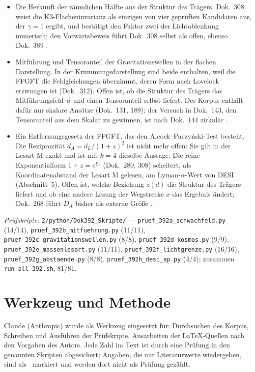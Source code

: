 \begin{itemize}[leftmargin=*,itemsep=1pt]
\item Die Herkunft der räumlichen Hälfte aus der Struktur des Trägers. Dok.~308 weist die
K3-Flächeninvarianz als einzigen von vier geprüften Kandidaten aus, der $\gamma=1$ ergibt, und bestätigt
den Faktor zwei der Lichtablenkung numerisch; den Vorwärtsbeweis führt Dok.~308 selbst als offen,
ebenso Dok.~389 \SM.
\item Mitführung und Tensoranteil der Gravitationswellen in der flachen Darstellung. In der
Krümmungsdarstellung sind beide enthalten, weil die FFGFT die Feldgleichungen übernimmt, deren Form
nach Lovelock erzwungen ist (Dok.~312). Offen ist, ob die Struktur des Trägers das Mitführungsfeld
$\vec u$ und einen Tensoranteil selbst liefert. Der Korpus enthält dafür nur skalare Ansätze
(Dok.~131, 189); der Versuch in Dok.~143, den Tensoranteil aus dem Skalar zu gewinnen, ist nach
Dok.~144 zirkulär \SM.
\item Ein Entfernungsgesetz der FFGFT, das den Alcock--Paczyński-Test besteht. Die Reziprozität
$d_A=d_L/(1+z)^2$ ist nicht mehr offen: Sie gilt in der Lesart M exakt und ist mit $k=4$ dieselbe
Aussage. Die reine Exponentialform $1+z=e^{\xi x}$ (Dok.~280, 308) scheitert, als Koordinatenabstand
der Lesart M gelesen, am Lyman-$\alpha$-Wert von DESI (Abschnitt~5). Offen ist, welche Beziehung
$z(d)$ die Struktur des Trägers liefert und ob eine andere Lesung der Wegstrecke $x$ das Ergebnis
ändert; Dok.~268 führt $D_A$ bisher als externe Größe \SM.
\end{itemize}

\vspace{1em}
\noindent\textit{Prüfskripte:} \texttt{2/python/Dok392\_Skripte/} --- \texttt{pruef\_392a\_schwachfeld.py}
(14/14), \texttt{pruef\_392b\_mitfuehrung.py} (11/11), \texttt{pruef\_392c\_gravitationswellen.py} (8/8),
\texttt{pruef\_392d\_kosmos.py} (9/9), \texttt{pruef\_392e\_massenlesart.py} (11/11), \texttt{pruef\_392f\_lichtgrenze.py} (16/16), \texttt{pruef\_392g\_abstaende.py} (8/8),
\texttt{pruef\_392h\_desi\_ap.py} (4/4); zusammen \texttt{run\_all\_392.sh}, 81/81.

\section*{Werkzeug und Methode}

Claude (Anthropic) wurde als Werkzeug eingesetzt für: Durchsuchen des Korpus, Schreiben und Ausführen
der Prüfskripte, Ausarbeiten der \LaTeX-Quellen nach den Vorgaben des Autors. Jede Zahl im Text ist
durch eine Prüfung in den genannten Skripten abgesichert; Angaben, die nur Literaturwerte wiedergeben,
sind als \QM\ markiert und werden dort nicht als Prüfung gezählt.

